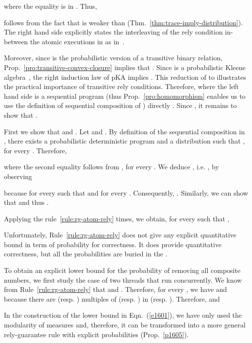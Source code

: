 \documentclass[review]{elsart}
\newcommand{\Eqn}[1]{Eqn.~(\ref{#1})}
\newcommand{\Prop}[1]{Prop.~\ref{#1}}
\newcommand{\Thm}[1]{Thm.~\ref{#1}}
\begin{document}
where the equality is in . Thus, 

follows from the fact that  is weaker than  (\Thm{thm:trace-imply-distribution}). The right hand side explicitly  states the interleaving of the rely condition  in-between the atomic executions in  as in~\cite{Jon12}. 

Moreover, since  is the probabilistic version of a transitive binary relation, \Prop{pro:transitive-convex-closure} implies that . Since  is a probabilistic Kleene algebra~\cite{Mci05}, the right induction law of pKA implies . This reduction of  to  illustrates the practical importance of transitive rely conditions. Therefore, 
where the left hand side is a sequential program (thus \Prop{pro:homomorphism} enables us to use the definition of sequential composition of ) directly
. Since , it remains to show that .

First we show that  and 
 . Let  and . By definition of the sequential composition in , there exists a probabilistic deterministic program  and a distribution  such that 
,
for every . Therefore, 


where the second equality follows from , for every . We deduce , i.e. , by observing

because  for every  such that  and  for every . Consequently, .
Similarly, we can show that  and thus . 


Applying the rule~\ref{rule:rg-atom-rely}  times, we obtain, for every  such that ,


Unfortunately, Rule~\ref{rule:rg-atom-rely} does not give any explicit quantitative bound in term of probability for correctness. It does provide quantitative correctness, but all the probabilities are buried in the .

To obtain an explicit lower bound for the probability of removing all composite numbers, we first study the case of two threads that run concurrently. We know from Rule~\ref{rule:rg-atom-rely} that  and . Therefore, for every , we have  and  because there are  (resp. ) multiples of  (resp. ) in  (resp. ). Therefore,  and 

In the construction of the lower bound in \Eqn{e1601}, we have only used the modularity of measures and, therefore, it can be transformed into a more general rely-guarantee rule with explicit probabilities (\Prop{p1605}).
\end{document}
